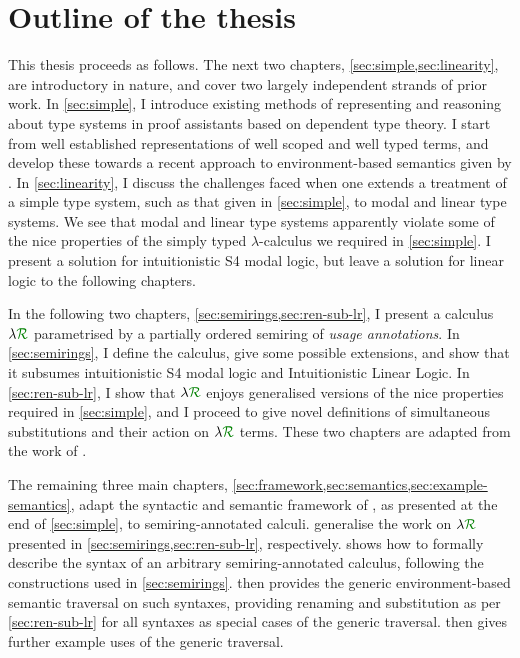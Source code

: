 \section{Outline of the thesis}

This thesis proceeds as follows.
The next two chapters, \cref{sec:simple,sec:linearity}, are introductory in
nature, and cover two largely independent strands of prior work.
In \cref{sec:simple}, I introduce existing methods of representing and reasoning
about type systems in proof assistants based on dependent type theory.
I start from well established representations of well scoped and well typed
terms, and develop these towards a recent approach to environment-based
semantics given by \citet{AACMM21}.
In \cref{sec:linearity}, I discuss the challenges faced when one extends a
treatment of a simple type system, such as that given in \cref{sec:simple}, to
modal and linear type systems.
We see that modal and linear type systems apparently violate some of the nice
properties of the simply typed $\lambda$-calculus we required in
\cref{sec:simple}.
I present a solution for intuitionistic S4 modal logic, but leave a solution for
linear logic to the following chapters.

In the following two chapters, \cref{sec:semirings,sec:ren-sub-lr}, I present a
calculus $\name$ parametrised by a partially ordered semiring of \emph{usage
annotations}.
In \cref{sec:semirings}, I define the calculus, give some possible extensions,
and show that it subsumes intuitionistic S4 modal logic and Intuitionistic
Linear Logic.
In \cref{sec:ren-sub-lr}, I show that $\name$ enjoys generalised versions of the
nice properties required in \cref{sec:simple}, and I proceed to give novel
definitions of simultaneous substitutions and their action on $\name$ terms.
These two chapters are adapted from the work of \citet{WA21}.

The remaining three main chapters,
\cref{sec:framework,sec:semantics,sec:example-semantics}, adapt the syntactic
and semantic framework of \citet{AACMM21}, as presented at the end of
\cref{sec:simple}, to semiring-annotated calculi.
 generalise the work on $\name$ presented in
\cref{sec:semirings,sec:ren-sub-lr}, respectively.
 shows how to formally describe the syntax of an arbitrary
semiring-annotated calculus, following the constructions used in
\cref{sec:semirings}.
 then provides the generic environment-based semantic
traversal on such syntaxes, providing renaming and substitution as per
\cref{sec:ren-sub-lr} for all syntaxes as special cases of the generic
traversal.
 then gives further example uses of the generic
traversal.

